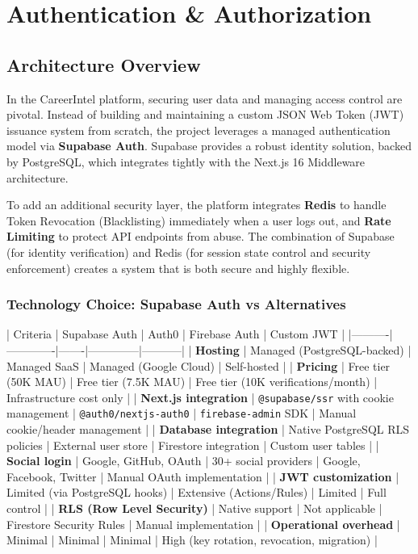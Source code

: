 \chapter{Authentication \& Authorization}

\section{Architecture Overview}

In the CareerIntel platform, securing user data and managing access control are pivotal. Instead of building and maintaining a custom JSON Web Token (JWT) issuance system from scratch, the project leverages a managed authentication model via \textbf{Supabase Auth}. Supabase provides a robust identity solution, backed by PostgreSQL, which integrates tightly with the Next.js 16 Middleware architecture.

To add an additional security layer, the platform integrates \textbf{Redis} to handle Token Revocation (Blacklisting) immediately when a user logs out, and \textbf{Rate Limiting} to protect API endpoints from abuse. The combination of Supabase (for identity verification) and Redis (for session state control and security enforcement) creates a system that is both secure and highly flexible.

\subsection{Technology Choice: Supabase Auth vs Alternatives}

| Criteria | Supabase Auth | Auth0 | Firebase Auth | Custom JWT |
|----------|-------------|-------|--------------|-----------|
| \textbf{Hosting} | Managed (PostgreSQL-backed) | Managed SaaS | Managed (Google Cloud) | Self-hosted |
| \textbf{Pricing} | Free tier (50K MAU) | Free tier (7.5K MAU) | Free tier (10K verifications/month) | Infrastructure cost only |
| \textbf{Next.js integration} | \texttt{@supabase/ssr} with cookie management | \texttt{@auth0/nextjs-auth0} | \texttt{firebase-admin} SDK | Manual cookie/header management |
| \textbf{Database integration} | Native PostgreSQL RLS policies | External user store | Firestore integration | Custom user tables |
| \textbf{Social login} | Google, GitHub, OAuth | 30+ social providers | Google, Facebook, Twitter | Manual OAuth implementation |
| \textbf{JWT customization} | Limited (via PostgreSQL hooks) | Extensive (Actions/Rules) | Limited | Full control |
| \textbf{RLS (Row Level Security)} | Native support | Not applicable | Firestore Security Rules | Manual implementation |
| \textbf{Operational overhead} | Minimal | Minimal | Minimal | High (key rotation, revocation, migration) |

